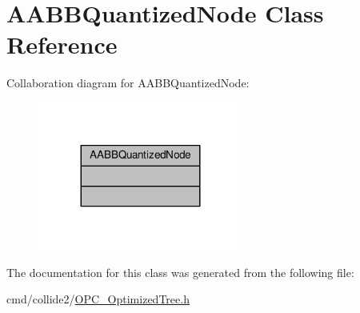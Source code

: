 \hypertarget{classAABBQuantizedNode}{}\section{A\+A\+B\+B\+Quantized\+Node Class Reference}
\label{classAABBQuantizedNode}


Collaboration diagram for A\+A\+B\+B\+Quantized\+Node\+:
\nopagebreak
\begin{figure}[H]
\begin{center}
\leavevmode
\includegraphics[width=191pt]{de/dce/classAABBQuantizedNode__coll__graph}
\end{center}
\end{figure}


The documentation for this class was generated from the following file\+:\begin{DoxyCompactItemize}
\item 
cmd/collide2/\hyperlink{OPC__OptimizedTree_8h}{O\+P\+C\+\_\+\+Optimized\+Tree.\+h}\end{DoxyCompactItemize}
